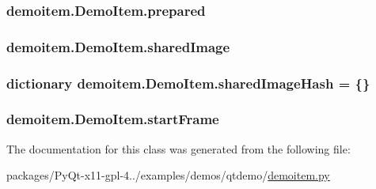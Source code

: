 \subsubsection[{prepared}]{\setlength{\rightskip}{0pt plus 5cm}demoitem.\+Demo\+Item.\+prepared}\label{classdemoitem_1_1DemoItem_a1a8a0acf5e3eaf68a2f9efef0fe21bd1}
\hypertarget{classdemoitem_1_1DemoItem_aaf54c5f33bc448d31f7520dc204f53b2}{}
\subsubsection[{shared\+Image}]{\setlength{\rightskip}{0pt plus 5cm}demoitem.\+Demo\+Item.\+shared\+Image}\label{classdemoitem_1_1DemoItem_aaf54c5f33bc448d31f7520dc204f53b2}
\hypertarget{classdemoitem_1_1DemoItem_a584fa91a610799d2aa3856fec02e293d}{}
\subsubsection[{shared\+Image\+Hash}]{\setlength{\rightskip}{0pt plus 5cm}dictionary demoitem.\+Demo\+Item.\+shared\+Image\+Hash = \{\}\hspace{0.3cm}{\ttfamily [static]}}\label{classdemoitem_1_1DemoItem_a584fa91a610799d2aa3856fec02e293d}
\hypertarget{classdemoitem_1_1DemoItem_a4f1b15adcd4465c7d29ae0b9f322e100}{}
\subsubsection[{start\+Frame}]{\setlength{\rightskip}{0pt plus 5cm}demoitem.\+Demo\+Item.\+start\+Frame}\label{classdemoitem_1_1DemoItem_a4f1b15adcd4465c7d29ae0b9f322e100}


The documentation for this class was generated from the following file\+:\begin{DoxyCompactItemize}
\item 
packages/\+Py\+Qt-\/x11-\/gpl-\/4../examples/demos/qtdemo/\hyperlink{demoitem_8py}{demoitem.\+py}\end{DoxyCompactItemize}
